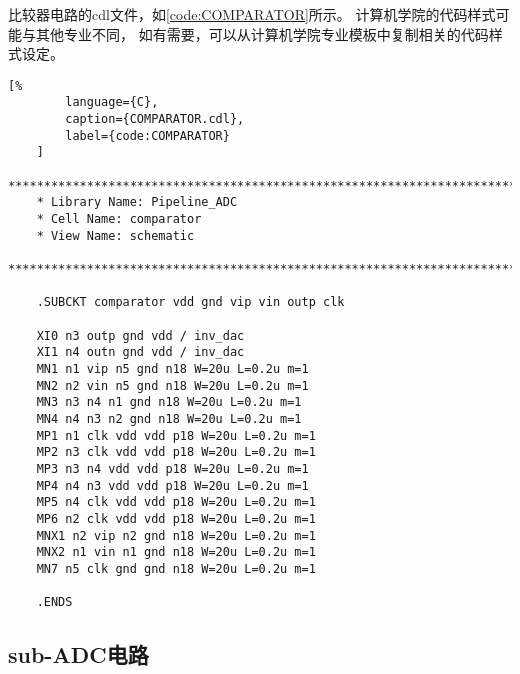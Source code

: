     \par 比较器电路的cdl文件，如\autoref{code:COMPARATOR}所示。
    计算机学院的代码样式可能与其他专业不同，
    如有需要，可以从计算机学院专业模板中复制相关的代码样式设定。

    \begin{lstlisting}[%
        language={C},
        caption={COMPARATOR.cdl},
        label={code:COMPARATOR}
    ]
    ********************************************************************************
    * Library Name: Pipeline_ADC
    * Cell Name: comparator
    * View Name: schematic
    ********************************************************************************

    .SUBCKT comparator vdd gnd vip vin outp clk

    XI0 n3 outp gnd vdd / inv_dac
    XI1 n4 outn gnd vdd / inv_dac
    MN1 n1 vip n5 gnd n18 W=20u L=0.2u m=1
    MN2 n2 vin n5 gnd n18 W=20u L=0.2u m=1
    MN3 n3 n4 n1 gnd n18 W=20u L=0.2u m=1
    MN4 n4 n3 n2 gnd n18 W=20u L=0.2u m=1
    MP1 n1 clk vdd vdd p18 W=20u L=0.2u m=1
    MP2 n3 clk vdd vdd p18 W=20u L=0.2u m=1
    MP3 n3 n4 vdd vdd p18 W=20u L=0.2u m=1
    MP4 n4 n3 vdd vdd p18 W=20u L=0.2u m=1
    MP5 n4 clk vdd vdd p18 W=20u L=0.2u m=1
    MP6 n2 clk vdd vdd p18 W=20u L=0.2u m=1
    MNX1 n2 vip n2 gnd n18 W=20u L=0.2u m=1
    MNX2 n1 vin n1 gnd n18 W=20u L=0.2u m=1
    MN7 n5 clk gnd gnd n18 W=20u L=0.2u m=1

    .ENDS
    \end{lstlisting}


\subsection{sub-ADC电路}
